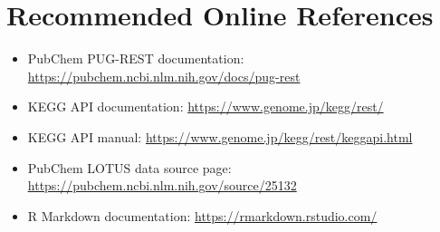 \section{Recommended Online References}
\begin{itemize}
  \item PubChem PUG-REST documentation: \url{https://pubchem.ncbi.nlm.nih.gov/docs/pug-rest}
  \item KEGG API documentation: \url{https://www.genome.jp/kegg/rest/}
  \item KEGG API manual: \url{https://www.genome.jp/kegg/rest/keggapi.html}
  \item PubChem LOTUS data source page: \url{https://pubchem.ncbi.nlm.nih.gov/source/25132}
  \item R Markdown documentation: \url{https://rmarkdown.rstudio.com/}
\end{itemize}
